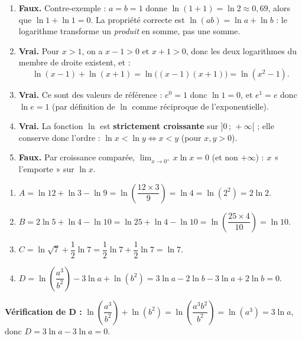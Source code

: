 \documentclass[11pt]{article}
\begin{document}
\begin{corrige}
\begin{enumerate}
\item \textbf{Faux.} Contre-exemple : $a=b=1$ donne $\ln(1+1)=\ln 2\approx 0{,}69$, alors que $\ln 1+\ln 1=0$. La propriété correcte est $\ln(ab)=\ln a+\ln b$ : le logarithme transforme un \emph{produit} en somme, pas une somme.
\item \textbf{Vrai.} Pour $x>1$, on a $x-1>0$ et $x+1>0$, donc les deux logarithmes du membre de droite existent, et :
\[ \ln(x-1)+\ln(x+1)=\ln\bigl((x-1)(x+1)\bigr)=\ln(x^2-1). \]
\item \textbf{Vrai.} Ce sont des valeurs de référence : $e^0=1$ donc $\ln 1=0$, et $e^1=e$ donc $\ln e=1$ (par définition de $\ln$ comme réciproque de l'exponentielle).
\item \textbf{Vrai.} La fonction $\ln$ est \textbf{strictement croissante} sur $]0\,;\,+\infty[$ ; elle conserve donc l'ordre : $\ln x<\ln y \iff x<y$ (pour $x,y>0$).
\item \textbf{Faux.} Par croissance comparée, $\displaystyle\lim_{x\to 0^+}x\ln x=0$ (et non $+\infty$) : $x$ « l'emporte » sur $\ln x$.
\end{enumerate}
\end{corrige}

\begin{corrige}
\begin{enumerate}
\item $A=\ln 12+\ln 3-\ln 9=\ln\left(\dfrac{12\times 3}{9}\right)=\ln 4=\ln(2^2)=2\ln 2$.
\item $B=2\ln 5+\ln 4-\ln 10=\ln 25+\ln 4-\ln 10=\ln\left(\dfrac{25\times 4}{10}\right)=\ln 10$.
\item $C=\ln\sqrt{7}+\dfrac{1}{2}\ln 7=\dfrac{1}{2}\ln 7+\dfrac{1}{2}\ln 7=\ln 7$.
\item $D=\ln\left(\dfrac{a^3}{b^2}\right)-3\ln a+\ln(b^2)=3\ln a-2\ln b-3\ln a+2\ln b=0$.
\end{enumerate}
\textbf{Vérification de D :} $\ln\left(\dfrac{a^3}{b^2}\right)+\ln(b^2)=\ln\left(\dfrac{a^3 b^2}{b^2}\right)=\ln(a^3)=3\ln a$, donc $D=3\ln a-3\ln a=0$. 
\end{corrige}
\end{document}
